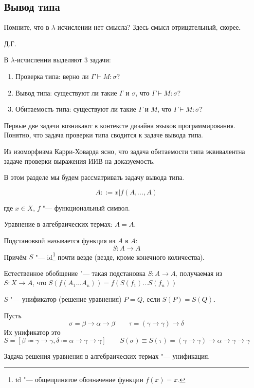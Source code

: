 \subsection{\texorpdfstring{Вывод типа}{Type deduction}}
\epigraph{Помните, что в $\lambda$-исчислении нет смысла? Здесь смысл отрицательный, скорее.}{Д.Г.}

В $\lambda$-исчислении выделяют 3 задачи:
\begin{enumerate}[label=(\asbuk*)]
    \item Проверка типа: верно ли $\Gamma \vdash M : \sigma$?
    \item Вывод типа: существуют ли такие $\Gamma$ и $\sigma$, что $\Gamma \vdash M : \sigma$?
    \item Обитаемость типа: существуют ли такие $\Gamma$ и $M$, что $\Gamma \vdash M : \sigma$?
\end{enumerate}%
Первые две задачи возникают в контексте дизайна языков программирования.
Понятно, что задача проверки типа сводится к задаче вывода типа.

Из изоморфизма Карри-Ховарда ясно, что задача обитаемости типа эквивалентна задаче проверки выражения ИИВ на доказуемость.

В этом разделе мы будем рассматривать задачу вывода типа.

\begin{definition}
    \begin{bnf}
    \[
        A ::= x | f\left(A, \ldots, A\right)
    \]
    \end{bnf}%
    где $x \in X$, $f$ "--- функциональный символ.
\end{definition}

Уравнение в алгебраических термах: $A = A$.

\begin{definition}[подстановка] Подстановкой называется функция из $A$ в $A$:
    \[
        S : A \to A
    \]
    Причём $S$ "--- id\footnote{id "--- общепринятое обозначение функции $f(x)=x$.} почти везде (везде, кроме конечного количества).
\end{definition}

\begin{definition}
    Естественное обобщение "--- такая подстановка $S : A \to A$, получаемая из $S : X \to A$, что
    $S\left(f\left(A_1 \dots A_n\right)\right) = f\left(S(f_1) \ldots S(f_n)\right)$
\end{definition}

\begin{definition}[унификатор] \label{unificator}
    $S$ "--- унификатор (решение уравнения) $P=Q$, если $S(P)=S(Q)$.
\end{definition}
\begin{example}
    Пусть
    \[
        \sigma = \beta\to\alpha\to\beta \qquad \tau = (\gamma\to\gamma)\to\delta
    \]
    Их унификатор это
    \[
        S = [\beta \coloneqq \gamma\to\gamma, \delta \coloneqq \alpha\to\gamma\to\gamma]
        \qquad S(\sigma) \equiv S(\tau) = (\gamma\to\gamma)\to\alpha\to\gamma\to\gamma
    \]
\end{example}
Задача решения уравнения в алгебраических термах "--- унификация.

